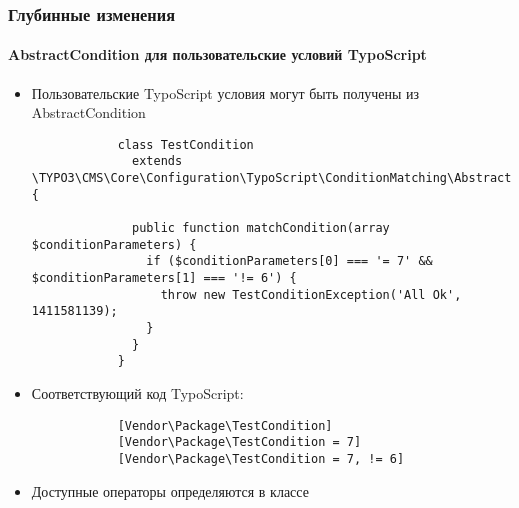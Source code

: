\begin{frame}[fragile]
	\frametitle{Глубинные изменения}
	\framesubtitle{AbstractCondition для пользовательские условий TypoScript}

	\lstset{
		basicstyle=\tiny\ttfamily
	}

	\begin{itemize}
		\item Пользовательские TypoScript условия могут быть получены из AbstractCondition

		\begin{lstlisting}
			class TestCondition
			  extends \TYPO3\CMS\Core\Configuration\TypoScript\ConditionMatching\AbstractCondition {

			  public function matchCondition(array $conditionParameters) {
 			    if ($conditionParameters[0] === '= 7' && $conditionParameters[1] === '!= 6') {
			      throw new TestConditionException('All Ok', 1411581139);
			    }
			  }
			}
		\end{lstlisting}

		\item Соответствующий код TypoScript:

		\begin{lstlisting}
			[Vendor\Package\TestCondition]
			[Vendor\Package\TestCondition = 7]
			[Vendor\Package\TestCondition = 7, != 6]
		\end{lstlisting}

		\item Доступные операторы определяются в классе

	\end{itemize}

\end{frame}


